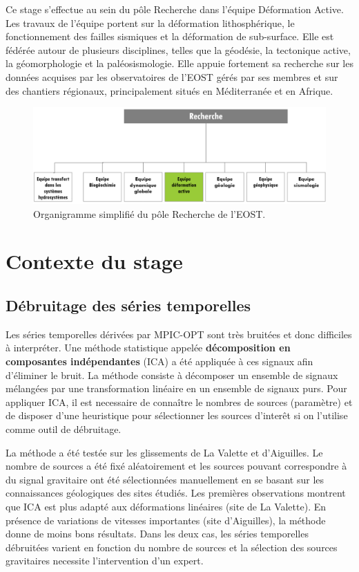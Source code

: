 \documentclass[11pt, openany]{report}
\begin{document}
Ce stage s'effectue au sein du pôle Recherche dans l'équipe Déformation Active. Les travaux de l'équipe portent sur la déformation lithosphérique, le fonctionnement des failles sismiques et la déformation de sub-surface. Elle est fédérée autour de plusieurs disciplines, telles que la géodésie, la tectonique active, la géomorphologie et la paléosismologie. Elle appuie fortement sa recherche sur les données acquises par les observatoires de l'EOST gérés par ses membres et sur des chantiers régionaux, principalement situés en Méditerranée et en Afrique.

\begin{figure}[H]
  \centering
  \includegraphics[width=0.6\linewidth]{recherche.png}
  \caption{Organigramme simplifié du pôle Recherche de l'EOST.}
\end{figure}
\chapter{Contexte du stage}

\section{Débruitage des séries temporelles}
Les séries temporelles dérivées par MPIC-OPT sont très bruitées et donc difficiles à interpréter. Une méthode statistique appelée \textbf{décomposition en composantes indépendantes} (ICA) a été appliquée à ces signaux afin d'éliminer le bruit. La méthode consiste à décomposer un ensemble de signaux mélangées par une transformation linéaire en un ensemble de signaux purs. Pour appliquer ICA, il est necessaire de connaître le nombres de sources (paramètre) et de disposer d'une heuristique pour sélectionner les sources d'interêt si on l'utilise comme outil de débruitage.

La méthode a été testée sur les glissements de La Valette et d'Aiguilles. Le nombre de sources a été fixé aléatoirement et les sources pouvant correspondre à du signal gravitaire ont été sélectionnées manuellement en se basant sur les connaissances géologiques des sites étudiés. Les premières observations montrent que ICA est plus adapté aux déformations linéaires (site de La Valette). En présence de variations de vitesses importantes (site d'Aiguilles), la méthode donne de moins bons résultats. Dans les deux cas, les séries temporelles débruitées varient en fonction du nombre de sources et la sélection des sources gravitaires necessite l'intervention d'un expert.
\end{document}
